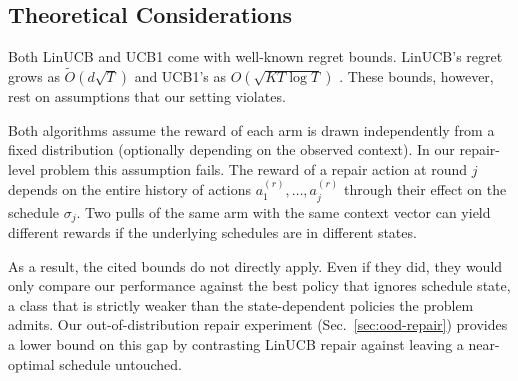 \documentclass{article}
\begin{document}
\subsection{Theoretical Considerations}

Both LinUCB and UCB1 come with well-known regret bounds. LinUCB's regret
grows as $\widetilde{O}(d\sqrt{T})$
\citep{li2010contextual,chu2011contextual,abbasi2011improved} and UCB1's as
$O(\sqrt{KT \log T})$ \citep{auer2002finitetime}. These bounds, however,
rest on assumptions that our setting violates.

Both algorithms assume the reward of each arm is drawn independently from a
fixed distribution (optionally depending on the observed context). In our
repair-level problem this assumption fails. The reward of a repair action
at round $j$ depends on the entire history of actions
$a^{(r)}_1,\ldots,a^{(r)}_j$ through their effect on the schedule
$\sigma_j$. Two pulls of the same arm with the same context vector can
yield different rewards if the underlying schedules are in different
states.

As a result, the cited bounds do not directly apply. Even if they did, they
would only compare our performance against the best policy that ignores
schedule state, a class that is strictly weaker than the state-dependent
policies the problem admits. Our out-of-distribution repair experiment
(Sec.~\ref{sec:ood-repair}) provides a lower bound on this gap by
contrasting LinUCB repair against leaving a near-optimal schedule
untouched.

\end{document}
